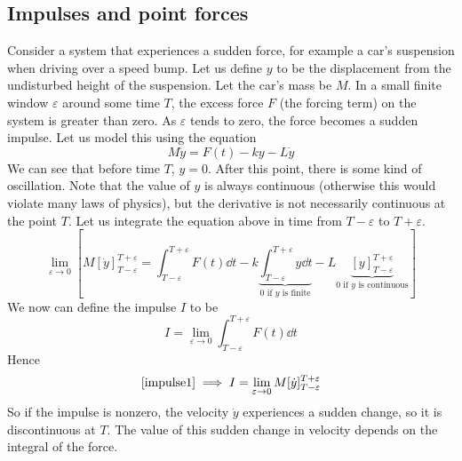 \subsection{Impulses and point forces}
Consider a system that experiences a sudden force, for example a car's suspension when driving over a speed bump.
Let us define \(y\) to be the displacement from the undisturbed height of the suspension.
Let the car's mass be \(M\).
In a small finite window \(\varepsilon\) around some time \(T\), the excess force \(F\) (the forcing term) on the system is greater than zero.
As \(\varepsilon\) tends to zero, the force becomes a sudden impulse.
Let us model this using the equation
\[
	M\ddot y = F(t) - ky - L\dot y
\]
We can see that before time \(T\), \(y=0\).
After this point, there is some kind of oscillation.
Note that the value of \(y\) is always continuous (otherwise this would violate many laws of physics), but the derivative is not necessarily continuous at the point \(T\).
Let us integrate the equation above in time from \(T - \varepsilon\) to \(T + \varepsilon\).
\begin{equation}\label{impulse1}
	\lim_{\varepsilon \to 0} \left[ M[\dot y]_{T - \varepsilon}^{T + \varepsilon} = \int_{T - \varepsilon}^{T + \varepsilon} F(t) \dd{t} - k \underbrace{\int_{T - \varepsilon}^{T + \varepsilon} y \dd{t}}_{0\text{ if \(y\) is finite}} - L\underbrace{[y]_{T - \varepsilon}^{T + \varepsilon}}_{0\text{ if \(y\) is continuous}} \right]
\end{equation}
We now can define the impulse \(I\) to be
\[
	I = \lim_{\varepsilon \to 0} \int_{T - \varepsilon}^{T + \varepsilon} F(t) \dd{t}
\]
Hence
\[
	\eqref{impulse1} \implies I = \lim_{\varepsilon \to 0} M[\dot y]_{T - \varepsilon}^{T + \varepsilon}
\]
So if the impulse is nonzero, the velocity \(\dot y\) experiences a sudden change, so it is discontinuous at \(T\).
The value of this sudden change in velocity depends on the integral of the force.
